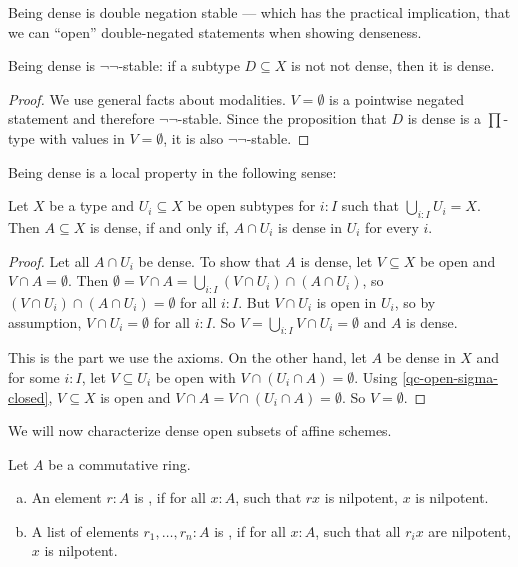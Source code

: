 Being dense is double negation stable ---
which has the practical implication,
that we can ``open'' double-negated statements when showing denseness.

\begin{proposition}%
  \label{dense-double-negation-stable}
  Being dense is $\neg\neg$-stable:
  if a subtype $D \subseteq X$ is not not dense, then it is dense.
\end{proposition}

\begin{proof}
  We use general facts about modalities.
  $V=\emptyset$ is a pointwise negated statement and therefore $\neg\neg$-stable.
  Since the proposition that $D$ is dense is a $\prod$-type with values in $V=\emptyset$,
  it is also $\neg\neg$-stable.
\end{proof}

Being dense is a local property in the following sense:

\begin{lemma}%
  \label{dense-local}
  Let $X$ be a type
  and $U_i\subseteq X$ be open subtypes for $i:I$ such that $\bigcup_{i:I}U_i=X$.
  Then $A\subseteq X$ is dense, if and only if,
  $A\cap U_i$ is dense in $U_i$ for every $i$.
\end{lemma}

\begin{proof}
  Let all $A\cap U_i$ be dense.
  To show that $A$ is dense, let $V\subseteq X$ be open and $V\cap A= \emptyset$.
  Then $\emptyset=V\cap A=\bigcup_{i:I}(V\cap U_i)\cap (A\cap U_i)$,
  so $(V\cap U_i)\cap (A\cap U_i) = \emptyset$ for all $i:I$.
  But $V\cap U_i$ is open in $U_i$, so by assumption, $V\cap U_i=\emptyset$ for all $i:I$.
  So $V=\bigcup_{i:I}V\cap U_i=\emptyset$ and $A$ is dense.

  This is the part we use the axioms.
  On the other hand, let $A$ be dense in $X$ and for some $i:I$,
  let $V\subseteq U_i$ be open with $V\cap (U_i\cap A)=\emptyset$.
  Using \cref{qc-open-sigma-closed}, $V\subseteq X$ is open and $V\cap A=V\cap (U_i\cap A)=\emptyset$.
  So $V=\emptyset$.
\end{proof}

We will now characterize dense open subsets of affine schemes.

\begin{definition}
  Let $A$ be a commutative ring.
  \begin{enumerate}[(a)]
  \item An element $r:A$ is , if for all $x:A$, such that $rx$ is nilpotent, $x$ is nilpotent.
  \item A list of elements $r_1,\dots,r_n:A$ is , if for all $x:A$,
    such that all $r_ix$ are nilpotent, $x$ is nilpotent.
  \end{enumerate}
\end{definition}

